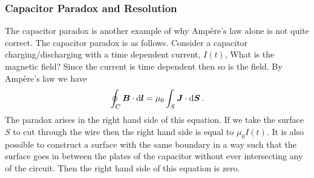     \subsubsection{Capacitor Paradox and Resolution}
    The capacitor paradox is another example of why Amp\`ere's law alone is not quite correct.
    The capacitor paradox is as follows.
    Consider a capacitor charging/discharging with a time dependent current, \(I(t)\),
    What is the magnetic field?
    Since the current is time dependent then so is the field.
    By Amp\`ere's law we have
    \[\oint_C\bm{B}\cdot\dd{\bm{l}} = \mu_0\int_S\bm{J}\cdot\dd{\bm{S}}.\]
    The paradox arises in the right hand side of this equation.
    If we take the surface \(S\) to cut through the wire then the right hand side is equal to \(\mu_0I(t)\).
    It is also possible to construct a surface with the same boundary in a way such that the surface goes in between the plates of the capacitor without ever intersecting any of the circuit.
    Then the right hand side of this equation is zero.
    
